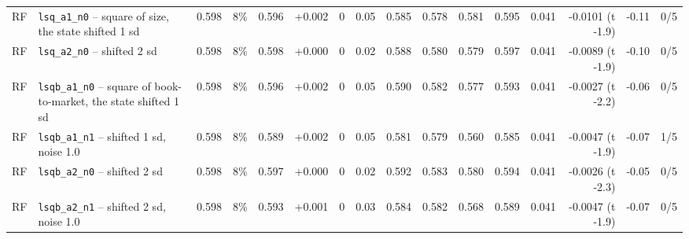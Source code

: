 \begin{landscape}
\begin{longtable}{lp{4.6cm}rrrrrrrrrrrrrr}
RF & \texttt{lsq\_a1\_n0} -- square of size, the state shifted 1 sd & 0.598 & 8\% & 0.596 & +0.002 & 0 & 0.05 & 0.585 & 0.578 & 0.581 & 0.595 & 0.041 & -0.0101 (t -1.9) & -0.11 & 0/5 \\
RF & \texttt{lsq\_a2\_n0} -- shifted 2 sd & 0.598 & 8\% & 0.598 & +0.000 & 0 & 0.02 & 0.588 & 0.580 & 0.579 & 0.597 & 0.041 & -0.0089 (t -1.9) & -0.10 & 0/5 \\
RF & \texttt{lsqb\_a1\_n0} -- square of book-to-market, the state shifted 1 sd & 0.598 & 8\% & 0.596 & +0.002 & 0 & 0.05 & 0.590 & 0.582 & 0.577 & 0.593 & 0.041 & -0.0027 (t -2.2) & -0.06 & 0/5 \\
RF & \texttt{lsqb\_a1\_n1} -- shifted 1 sd, noise 1.0 & 0.598 & 8\% & 0.589 & +0.002 & 0 & 0.05 & 0.581 & 0.579 & 0.560 & 0.585 & 0.041 & -0.0047 (t -1.9) & -0.07 & 1/5 \\
RF & \texttt{lsqb\_a2\_n0} -- shifted 2 sd & 0.598 & 8\% & 0.597 & +0.000 & 0 & 0.02 & 0.592 & 0.583 & 0.580 & 0.594 & 0.041 & -0.0026 (t -2.3) & -0.05 & 0/5 \\
RF & \texttt{lsqb\_a2\_n1} -- shifted 2 sd, noise 1.0 & 0.598 & 8\% & 0.593 & +0.001 & 0 & 0.03 & 0.584 & 0.582 & 0.568 & 0.589 & 0.041 & -0.0047 (t -1.9) & -0.07 & 0/5 \\
\end{longtable}

\end{landscape}
